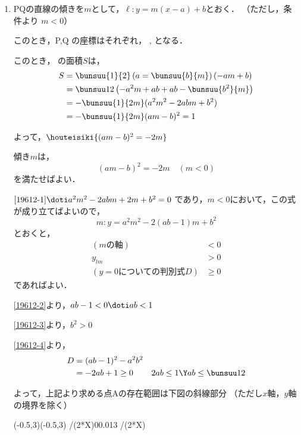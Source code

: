 \begin{enumerate}
    \item PQの直線の傾きを$m$として，$\ell :y = m(x-a) + b$とおく．
    （ただし，条件より $m<0$）

    このとき，P,Q の座標はそれぞれ，
    ,
    となる．

    このとき， の面積$S$は，
    \begin{align*}
        S &= \bunsuu{1}{2}\left(a = \bunsuu{b}{m}\right)(-am + b)\\
        &=\bunsuu12 \left(-a^2m + ab + ab - \bunsuu{b^2}{m}\right)\\
        &=-\bunsuu{1}{2m} (a^2m^2-2abm+b^2)\\
        &=-\bunsuu{1}{2m} (am-b)^2 = 1
    \end{align*}

    よって，$\houteisiki{(am-b)^2=-2m} \label{19612-1}$

    傾き$m$は，
    \[(am-b)^2 = -2m \quad (m<0)\]
    を満たせばよい．

    $\eqref{19612-1} \doti a^2m^2-2abm+2m+b^2 = 0$\quad
    であり，$m<0$において，この式が成り立てばよいので，
    \[m:y=a^2m^2-2(ab-1)m + b^2\]
    とおくと，
    \begin{align}
        (mの軸) &< 0 \label{19612-2}\\
        y_{lm} &> 0 \label{19612-3}\\
        (y = 0 についての判別式D) &\geq 0 \label{19612-4}
    \end{align}
    であればよい．

    \eqref{19612-2}より，$ab-1<0 \doti ab < 1$

    \eqref{19612-3}より，$b^2 > 0$

    \eqref{19612-4}より，
    \begin{align*}
        D &= (ab-1)^2-a^2b^2\\
        &=-2ab + 1\geq 0
        &2ab \leq 1 \Y ab \leq \bunsuu12
    \end{align*}

    よって，上記より求める点Aの存在範囲は下図の斜線部分
    （ただし$x$軸，$y$軸の境界を除く）

    \begin{center}
        \begin{pszahyou}[ul=12mm](-0.5,3)(-0.5,3)
            \def\Fx{1/(2*X)}
            \def\Gx{0}
            \YNurii*\Fx\Gx{0.01}{3}
            \YGurafu*\Fx
        \end{pszahyou}
    \end{center}
    \KOTAE



\end{enumerate}
